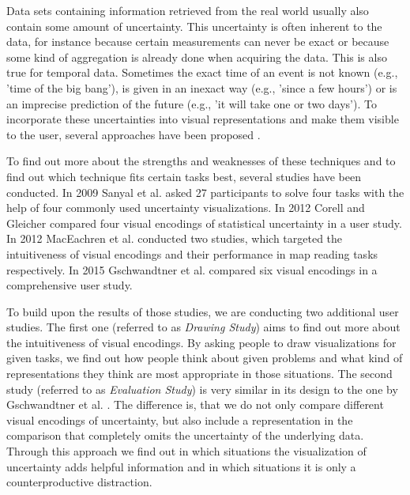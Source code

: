 Data sets containing information retrieved from the real world usually also contain some amount of uncertainty. This uncertainty is often inherent to the data, for instance because certain measurements can never be exact or because some kind of aggregation is already done when acquiring the data. This is also true for temporal data. Sometimes the exact time of an event is not known (e.g., 'time of the big bang'), is given in an inexact way (e.g., 'since a few hours') or is an imprecise prediction of the future (e.g., 'it will take one or two days'). To incorporate these uncertainties into visual representations and make them visible to the user, several approaches have been proposed \cite{kosara2001metaphors, chittaro2001visual, messner2000time, aigner2005planninglines, harris2000information}. \par \medskip

To find out more about the strengths and weaknesses of these techniques and to find out which technique fits certain tasks best, several studies have been conducted. In 2009 Sanyal et al. \cite{sanyal2009user} asked 27 participants to solve four tasks with the help of four commonly used uncertainty visualizations. In 2012 Corell and Gleicher \cite{correll2014error} compared four visual encodings of statistical uncertainty in a user study. In 2012 MacEachren et al. \cite{maceachren2012visual} conducted two studies, which targeted the intuitiveness of visual encodings and their performance in map reading tasks respectively. In 2015 Gschwandtner et al. \cite{gschwandtner2016visual} compared six visual encodings in a comprehensive user study. \par \medskip

To build upon the results of those studies, we are conducting two additional user studies. The first one (referred to as \textit{Drawing Study}) aims to find out more about the intuitiveness of visual encodings. By asking people to draw visualizations for given tasks, we find out how people think about given problems and what kind of representations they think are most appropriate in those situations. The second study (referred to as \textit{Evaluation Study}) is very similar in its design to the one by Gschwandtner et al. \cite{gschwandtner2016visual}. The difference is, that we do not only compare different visual encodings of uncertainty, but also include a representation in the comparison that completely omits the uncertainty of the underlying data. Through this approach we find out in which situations the visualization of uncertainty adds helpful information and in which situations it is only a counterproductive distraction. \par \medskip

